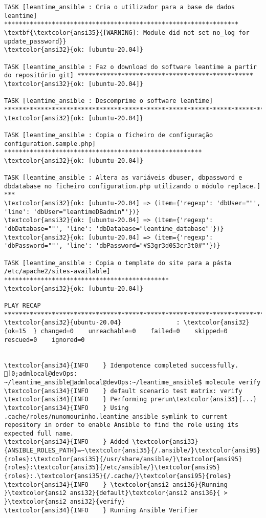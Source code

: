 \documentclass{scrartcl}
\begin{document}
\begin{Verbatim}
TASK [leantime_ansible : Cria o utilizador para a base de dados leantime] ****************************************************************
\textbf{\textcolor{ansi35}{[WARNING]: Module did not set no_log for update_password}}
\textcolor{ansi32}{ok: [ubuntu-20.04]}

TASK [leantime_ansible : Faz o download do software leantime a partir do repositório git] ************************************************
\textcolor{ansi32}{ok: [ubuntu-20.04]}

TASK [leantime_ansible : Descomprime o software leantime] ********************************************************************************
\textcolor{ansi32}{ok: [ubuntu-20.04]}

TASK [leantime_ansible : Copia o ficheiro de configuração configuration.sample.php] ******************************************************
\textcolor{ansi32}{ok: [ubuntu-20.04]}

TASK [leantime_ansible : Altera as variáveis dbuser, dbpassword e dbdatabase no ficheiro configuration.php utilizando o módulo replace.] ***
\textcolor{ansi32}{ok: [ubuntu-20.04] => (item={'regexp': 'dbUser=""', 'line': 'dbUser="leantimeDBadmin"'})}
\textcolor{ansi32}{ok: [ubuntu-20.04] => (item={'regexp': 'dbDatabase=""', 'line': 'dbDatabase="leantime_database"'})}
\textcolor{ansi32}{ok: [ubuntu-20.04] => (item={'regexp': 'dbPassword=""', 'line': 'dbPassword="#S3gr3d0S3cr3t0#"'})}

TASK [leantime_ansible : Copia o template do site para a pásta /etc/apache2/sites-available] *********************************************
\textcolor{ansi32}{ok: [ubuntu-20.04]}

PLAY RECAP *******************************************************************************************************************************
\textcolor{ansi32}{ubuntu-20.04}               : \textcolor{ansi32}{ok=15  } changed=0    unreachable=0    failed=0    skipped=0    rescued=0    ignored=0


\textcolor{ansi34}{INFO    } Idempotence completed successfully.
]0;admlocal@devOps: ~/leantime_ansibleadmlocal@devOps:~/leantime_ansible$ molecule verify
\textcolor{ansi34}{INFO    } default scenario test matrix: verify
\textcolor{ansi34}{INFO    } Performing prerun\textcolor{ansi33}{...}
\textcolor{ansi34}{INFO    } Using .cache/roles/nunomourinho.leantime_ansible symlink to current repository in order to enable Ansible to find the role using its expected full name.
\textcolor{ansi34}{INFO    } Added \textcolor{ansi33}{ANSIBLE_ROLES_PATH}=~\textcolor{ansi35}{/.ansible/}\textcolor{ansi95}{roles}:\textcolor{ansi35}{/usr/share/ansible/}\textcolor{ansi95}{roles}:\textcolor{ansi35}{/etc/ansible/}\textcolor{ansi95}{roles}:.\textcolor{ansi35}{/.cache/}\textcolor{ansi95}{roles}
\textcolor{ansi34}{INFO    } \textcolor{ansi2 ansi36}{Running }\textcolor{ansi2 ansi32}{default}\textcolor{ansi2 ansi36}{ > }\textcolor{ansi2 ansi32}{verify}
\textcolor{ansi34}{INFO    } Running Ansible Verifier


\end{Verbatim}
\end{document}
